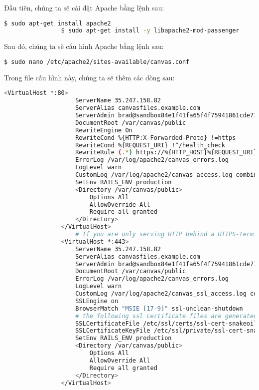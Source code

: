 \documentclass[../Thesis.tex]{subfiles}
\begin{document}
\begin{enumerate}
            Đầu tiên, chúng ta sẽ cài đặt Apache bằng lệnh sau:
            \begin{lstlisting}[language=bash]
                $ sudo apt-get install apache2
                $ sudo apt-get install -y libapache2-mod-passenger
            \end{lstlisting}

            Sau đó, chúng ta sẽ cấu hình Apache bằng lệnh sau:
            \begin{lstlisting}[language=bash]
                $ sudo nano /etc/apache2/sites-available/canvas.conf
            \end{lstlisting}

            Trong file cấu hình này, chúng ta sẽ thêm các dòng sau:
            \begin{lstlisting}[language=bash]
                <VirtualHost *:80>
                    ServerName 35.247.158.82
                    ServerAlias canvasfiles.example.com
                    ServerAdmin brad@sandbox84e1f41fa65f4f75941861cde77b288a.mailgun.org
                    DocumentRoot /var/canvas/public
                    RewriteEngine On
                    RewriteCond %{HTTP:X-Forwarded-Proto} !=https
                    RewriteCond %{REQUEST_URI} !^/health_check
                    RewriteRule (.*) https://%{HTTP_HOST}%{REQUEST_URI} [L]
                    ErrorLog /var/log/apache2/canvas_errors.log
                    LogLevel warn
                    CustomLog /var/log/apache2/canvas_access.log combined
                    SetEnv RAILS_ENV production
                    <Directory /var/canvas/public>
                        Options All
                        AllowOverride All
                        Require all granted
                    </Directory>
                </VirtualHost>
                    # If you are only serving HTTP behind a HTTPS-terminating load balancer, skip the next VirtualHost
                <VirtualHost *:443>
                    ServerName 35.247.158.82
                    ServerAlias canvasfiles.example.com
                    ServerAdmin brad@sandbox84e1f41fa65f4f75941861cde77b288a.mailgun.org
                    DocumentRoot /var/canvas/public
                    ErrorLog /var/log/apache2/canvas_errors.log
                    LogLevel warn
                    CustomLog /var/log/apache2/canvas_ssl_access.log combined
                    SSLEngine on
                    BrowserMatch "MSIE [17-9]" ssl-unclean-shutdown
                    # the following ssl certificate files are generated for you from the ssl-cert package.
                    SSLCertificateFile /etc/ssl/certs/ssl-cert-snakeoil.pem
                    SSLCertificateKeyFile /etc/ssl/private/ssl-cert-snakeoil.key
                    SetEnv RAILS_ENV production
                    <Directory /var/canvas/public>
                        Options All
                        AllowOverride All
                        Require all granted
                    </Directory>
                </VirtualHost>
            \end{lstlisting}


\end{enumerate}
\end{document}
